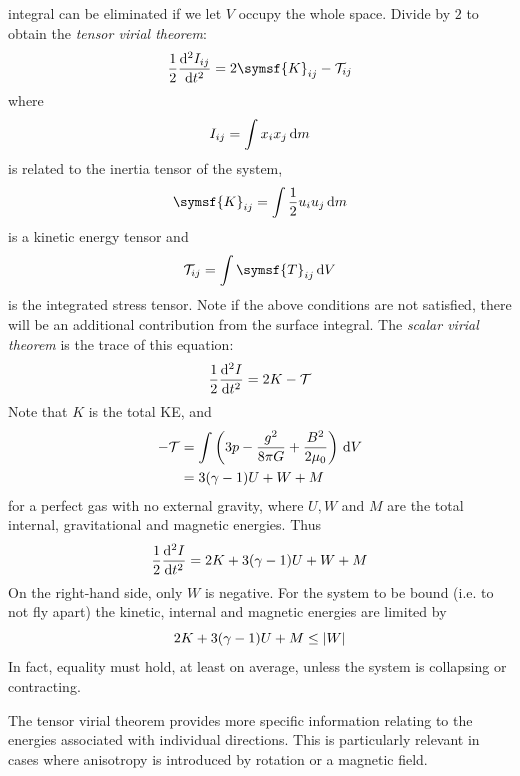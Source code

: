 \documentclass{jknotes}
\begin{document}
integral can be eliminated if we let $V$ occupy the whole space. Divide by $2$
to obtain the \emph{tensor virial theorem}:
\begin{equation}
	\frac{1}{2}\frac{\diffd^2 I_{ij}}{\diffd t^2}  = 2\symsf{K}_{ij} -
	\mathcal{T}_{ij}
\end{equation}
where 
\begin{equation}
	I_{ij} = \int x_i x_j \, \diffd m
\end{equation}
is related to the inertia tensor of the system, 
\begin{equation}
	\symsf{K}_{ij} = \int \frac{1}{2}u_i u_j \, \diffd m
\end{equation}
is a kinetic energy tensor and 
\begin{equation}
	\mathcal{T}_{ij} = \int \symsf{T}_{ij} \, \diffd V
\end{equation}
is the integrated stress tensor. Note if the above conditions are not
satisfied, there will be an additional contribution from the surface
integral. The \emph{scalar virial theorem} is the trace of this equation:
\begin{equation}
	\frac{1}{2}\frac{\diffd^2 I}{\diffd t^2} = 2K - \mathcal{T}
\end{equation}
Note that $K$ is the total KE, and
\begin{align}
	-\mathcal{T} &= \int \left( 3p - \frac{g^2}{8\pi G} + \frac{B^2}{2\mu_0}
	\right) \, \diffd V \\
				 &= 3 (\gamma -1 ) U + W + M
\end{align}
for a perfect gas with no external gravity, where $U, W$ and $M$ are the total
internal, gravitational and magnetic energies. Thus
\begin{equation}
	\frac{1}{2}\frac{\diffd^2 I}{\diffd t^2} = 2K + 3(\gamma - 1) U + W + M
\end{equation}
On the right-hand side, only $W$ is negative. For the system to be bound (i.e.
to not fly apart) the kinetic, internal and magnetic energies are limited by
\begin{equation}
	2K + 3(\gamma -1 )U + M \le \abs{W}
\end{equation}
In fact, equality must hold, at least on average, unless the system is
collapsing or contracting.

The tensor virial theorem provides more specific information relating to the
energies associated with individual directions. This is particularly relevant
in cases where anisotropy is introduced by rotation or a magnetic field.
\end{document}

